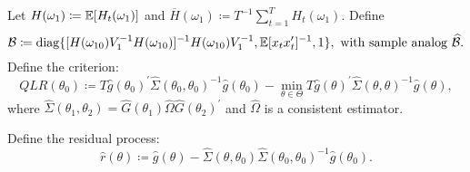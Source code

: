 \documentclass[smaller, aspectratio=169]{beamer}
\begin{document}
\begin{frame}

    Let $H(\omega_{1}) \coloneqq \mathbb{E}[H_{t}(\omega_{1})]$ and $\overline{H}(\omega_{1}) \coloneqq T^{-1}\sum_{t = 1}^{T}H_{t}(\omega_{1})$. Define 
%
    \begin{equation}
        \mathcal{B} \coloneqq \operatorname{diag}\lbrace[H(\omega_{10})V_{1}^{-1}H(\omega_{10})]^{-1}H(\omega_{10})V_{1}^{-1}, \mathbb{E}[x_{t}x_{t}^{\prime}]^{-1}, 1 \rbrace, \text{ with sample analog } \widehat{\mathcal{B}}.
        \label{Fhat}
    \end{equation}
%
    \bigskip
%
    Define the criterion:
%
    \begin{equation}
      QLR(\theta_{0}) \coloneqq T \widehat{g} (\theta_{0})^{\prime}\widehat{\Sigma} (\theta_{0}, \theta_{0})^{-1}\widehat{g}(\theta_{0})-\underset{\theta \in \Theta}{\min}T\widehat{g}(\theta)^{\prime}\widehat{\Sigma} (\theta, \theta)^{-1}\widehat{g}(\theta),  
      \label{QLR stat}
    \end{equation}
    where $\widehat{\Sigma}\left(\theta_{1}, \theta_{2}\right) = \widehat{G}(\theta_{1})\widehat{\Omega}\widehat{G}(\theta_{2})^{\prime}$ and $\widehat{\Omega}$ is a consistent estimator.
 
    \bigskip
%    
    Define the residual process:
    \begin{equation}
      \widehat{r}(\theta) \coloneqq \widehat{g}(\theta)-\widehat{\Sigma}(\theta, \theta_{0})\widehat{\Sigma}(\theta_{0}, \theta_{0})^{-1}\widehat{g} (\theta_{0}). 
      \label{red process}
    \end{equation}

\end{frame}
\end{document}
